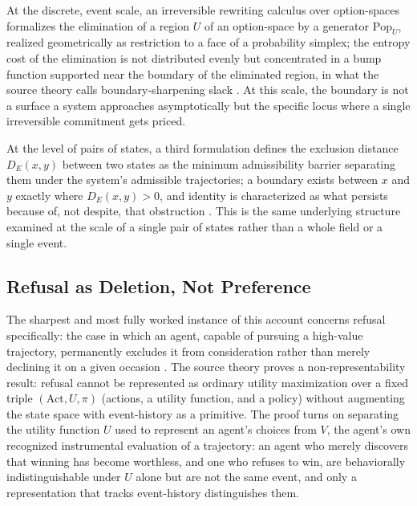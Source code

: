 \documentclass[11pt]{article}
\theoremstyle{plain}
\begin{document}
At the discrete, event scale, an irreversible rewriting calculus over option-spaces formalizes the elimination of a region $U$ of an option-space by a generator $\mathrm{Pop}_U$, realized geometrically as restriction to a face of a probability simplex; the entropy cost of the elimination is not distributed evenly but concentrated in a bump function supported near the boundary of the eliminated region, in what the source theory calls boundary-sharpening slack \citep{structuredirreversibility}. At this scale, the boundary is not a surface a system approaches asymptotically but the specific locus where a single irreversible commitment gets priced.

At the level of pairs of states, a third formulation defines the exclusion distance $D_E(x,y)$ between two states as the minimum admissibility barrier separating them under the system's admissible trajectories; a boundary exists between $x$ and $y$ exactly where $D_E(x,y) > 0$, and identity is characterized as what persists because of, not despite, that obstruction \citep{autonomyrefusal}. This is the same underlying structure examined at the scale of a single pair of states rather than a whole field or a single event.

\subsection{Refusal as Deletion, Not Preference}

The sharpest and most fully worked instance of this account concerns refusal specifically: the case in which an agent, capable of pursuing a high-value trajectory, permanently excludes it from consideration rather than merely declining it on a given occasion \citep{throwingthegame}. The source theory proves a non-representability result: refusal cannot be represented as ordinary utility maximization over a fixed triple $(\mathrm{Act}, U, \pi)$ (actions, a utility function, and a policy) without augmenting the state space with event-history as a primitive. The proof turns on separating the utility function $U$ used to represent an agent's choices from $V$, the agent's own recognized instrumental evaluation of a trajectory: an agent who merely discovers that winning has become worthless, and one who refuses to win, are behaviorally indistinguishable under $U$ alone but are not the same event, and only a representation that tracks event-history distinguishes them.
\end{document}
